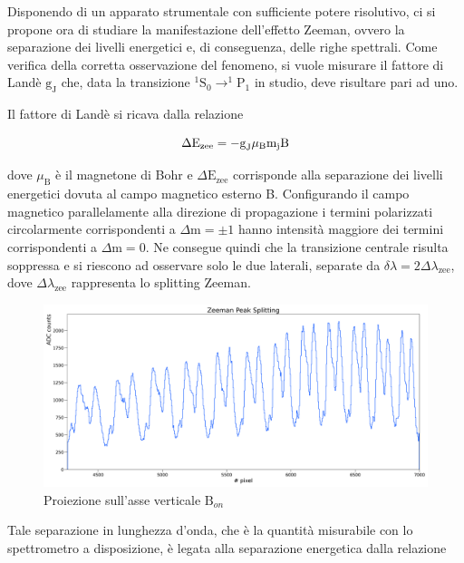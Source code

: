 \documentclass[twocolumn,10pt]{asme2ej}
\begin{document}
Disponendo di un apparato strumentale con sufficiente potere risolutivo, ci si propone ora di studiare la manifestazione
dell'effetto Zeeman, ovvero la separazione dei livelli energetici e, di conseguenza, delle righe spettrali. Come
verifica della corretta osservazione del fenomeno, si vuole misurare il fattore di Landè $\text{g}_{\text{J}}$ che, 
data la transizione $^1\text{S}_0 \rightarrow ^1\text{P}_1$ in studio, deve risultare pari ad uno.

Il fattore di Landè si ricava dalla relazione

\vspace{-15pt}
\begin{equation}
    \Delta \text{E}_{\text{zee}} = - \text{g}_{\text{J}} \mu_{\text{B}} \text{m}_{\text{j}} \text{B} 
    \label{e:gL}
\vspace{-5pt}
\end{equation}

dove $\mu_{\text{B}}$ è il magnetone di Bohr e $\Delta \text{E}_{\text{zee}}$ corrisponde alla separazione dei livelli
energetici dovuta al campo magnetico esterno B. Configurando il campo magnetico parallelamente alla direzione di
propagazione i termini polarizzati circolarmente corrispondenti a $\Delta \text{m} = \pm 1$ hanno intensità maggiore dei
termini corrispondenti a $\Delta \text{m} = 0$. Ne consegue quindi che la transizione centrale risulta soppressa e si
riescono ad osservare solo le due laterali, separate da $\delta\lambda = 2 \Delta\lambda_{\text{zee}}$, dove
$\Delta\lambda_{\text{zee}}$ rappresenta lo splitting Zeeman. 

\begin{figure}
    \centering
    \includegraphics[width=\textwidth]{../Plots/Bon_Y_proj.png}
    \caption{Proiezione sull'asse verticale $\text{B}_{on}$}
    \label{i:spettro2d_Bon_ProjY}
\end{figure}

\noindent Tale separazione in lunghezza d'onda, che è la quantità misurabile con lo spettrometro a disposizione, è legata alla
separazione energetica dalla relazione
\end{document}
